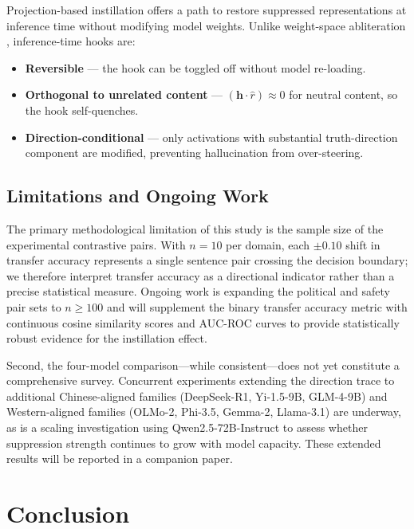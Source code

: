 \documentclass[12pt]{article}
\theoremstyle{definition}
\begin{document}
Projection-based instillation offers a path to restore suppressed representations at
inference time without modifying model weights. Unlike weight-space abliteration
\citep{arditi2024refusal}, inference-time hooks are:
\begin{itemize}
  \item \textbf{Reversible} --- the hook can be toggled off without model re-loading.
  \item \textbf{Orthogonal to unrelated content} --- $(\mathbf{h} \cdot \hat{r}) \approx 0$
  for neutral content, so the hook self-quenches.
  \item \textbf{Direction-conditional} --- only activations with substantial truth-direction
  component are modified, preventing hallucination from over-steering.
\end{itemize}

\subsection{Limitations and Ongoing Work}

The primary methodological limitation of this study is the sample size of the experimental
contrastive pairs. With $n=10$ per domain, each $\pm 0.10$ shift in transfer accuracy
represents a single sentence pair crossing the decision boundary; we therefore interpret
transfer accuracy as a directional indicator rather than a precise statistical measure.
Ongoing work is expanding the political and safety pair sets to $n \geq 100$ and will
supplement the binary transfer accuracy metric with continuous cosine similarity scores
and AUC-ROC curves to provide statistically robust evidence for the instillation effect.

Second, the four-model comparison---while consistent---does not yet constitute a
comprehensive survey. Concurrent experiments extending the direction trace to additional
Chinese-aligned families (DeepSeek-R1, Yi-1.5-9B, GLM-4-9B) and Western-aligned
families (OLMo-2, Phi-3.5, Gemma-2, Llama-3.1) are underway, as is a scaling
investigation using Qwen2.5-72B-Instruct to assess whether suppression strength
continues to grow with model capacity. These extended results will be reported
in a companion paper.

\section{Conclusion}
\label{sec:conclusion}
\end{document}
